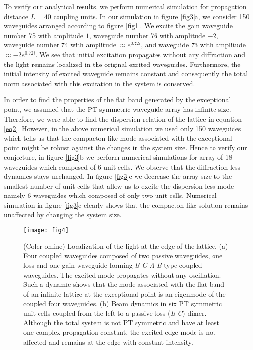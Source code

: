 \documentclass[aps,prl,twocolumn,showpacs,groupedaddress,amsmath,amssymb]{revtex4}
\begin{document}
To verify our analytical results, we perform numerical simulation for propagation distance $L=40$ coupling units. In our simulation in figure \ref{fig3}a, we consider 150 waveguides arranged according to figure \ref{fig1}. We excite the gain waveguide number 75 with amplitude $1$, waveguide number 76 with amplitude $-2$, waveguide number 74 with amplitude $\approx e^{0.72i}$, and waveguide 73 with amplitude $\approx -2 e^{0.72i}$. We see that initial excitation propagates without any diffraction and the light remains localized in the original excited waveguides. Furthermore, the initial intensity of excited waveguide remains constant and consequently the total norm associated with this excitation in the system is conserved.

In order to find the properties of the flat band generated by the exceptional point, we assumed that the PT symmetric waveguide array has infinite size. Therefore, we were able to find the dispersion relation of the lattice in equation \ref{eq2}. However, in the above numerical simulation we used only 150 waveguides which tells us that the compacton-like mode associated with the exceptional point might be robust against the changes in the system size. Hence to verify our conjecture, in figure \ref{fig3}b we perform numerical simulations for array of 18 waveguides which composed of 6 unit cells. We observe that the diffraction-less dynamics stays unchanged. In figure \ref{fig3}c we decrease the array size to the smallest number of unit cells that allow us to excite the dispersion-less mode namely 6 waveguides which composed of only two unit cells. Numerical simulation in figure \ref{fig3}c clearly shows that the compacton-like solution remains unaffected by changing the system size.

\begin{figure}
	\texttt{[image: fig4]}
	\caption{(Color online) Localization of the light at the edge of the lattice. (a) Four coupled waveguides composed of two passive waveguides, one loss and one gain waveguide forming \textit{B-C-A-B} type coupled waveguides. The excited mode propagates without any oscillation. Such a dynamic shows that the mode associated with the flat band of an infinite lattice at the exceptional point is an eigenmode of the coupled four waveguides. (b) Beam dynamics in six PT symmetric unit cells coupled from the left to a passive-loss (\textit{B-C}) dimer. Although the total system is not PT symmetric and have at least one complex propagation constant, the excited edge mode is not affected and remains at the edge with constant intensity.
		\label{fig4}}
\end{figure}
\end{document}
